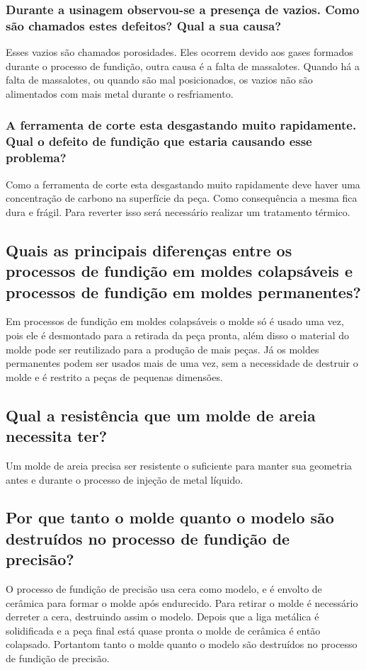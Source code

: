 \documentclass[a4paper, 12pt]{article}
\begin{document}
	\subsubsection{Durante a usinagem observou-se a presença de vazios. Como são chamados estes defeitos? Qual a sua causa?}
	Esses vazios são chamados porosidades. Eles ocorrem devido aos gases formados durante o processo de fundição, outra causa é a falta de massalotes. Quando há a falta de massalotes, ou quando são mal posicionados, os vazios não são alimentados com mais metal durante o resfriamento.
	\subsubsection{A ferramenta de corte esta desgastando muito rapidamente. Qual o defeito de fundição que estaria causando esse problema?}
	Como a ferramenta de corte esta desgastando muito rapidamente deve haver uma concentração de carbono na superfície da peça. Como consequência a mesma fica dura e frágil. Para reverter isso será necessário realizar um tratamento térmico.
	
	\subsection{Quais as principais diferenças entre os processos de fundição em moldes colapsáveis e processos de fundição em moldes permanentes?}
	Em processos de fundição em moldes colapsáveis o molde só é usado uma vez, pois ele é desmontado para a retirada da peça pronta, além disso o material do molde pode ser reutilizado para a produção de mais peças.
	Já os moldes permanentes podem ser usados mais de uma vez, sem a necessidade de destruir o molde e é restrito a peças de pequenas dimensões.
	
	\subsection{Qual a resistência que um molde de areia necessita ter?}
	Um molde de areia precisa ser resistente o suficiente para manter sua geometria antes e durante o processo de injeção de metal líquido.
	
	\subsection{Por que tanto o molde quanto o modelo são destruídos no processo de fundição de precisão?}
	O processo de fundição de precisão usa cera como modelo, e é envolto de cerâmica para formar o molde após endurecido. Para retirar o molde é necessário derreter a cera, destruindo assim o modelo. Depois que a liga metálica é solidificada e a peça final está quase pronta o molde de cerâmica é então colapsado. Portantom tanto o molde quanto o modelo são destruídos no processo de fundição de precisão.
	
\end{document}
